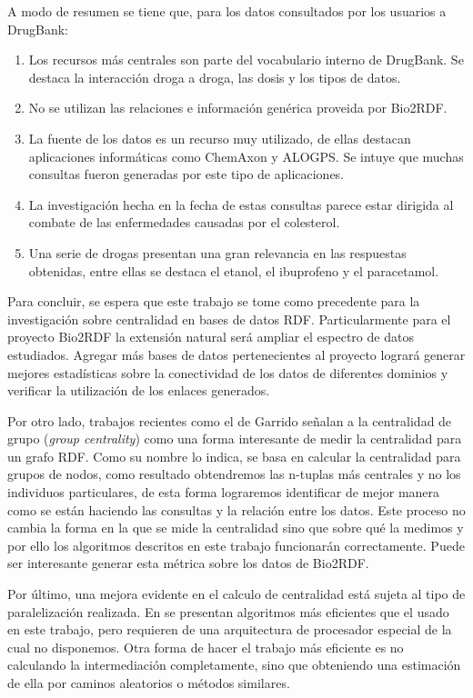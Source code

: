 A modo de resumen se tiene que, para los datos consultados por los usuarios a
DrugBank:
\begin{enumerate}
  \item
    Los recursos más centrales son parte del vocabulario interno de DrugBank.
    Se destaca la interacción droga a droga, las dosis y los tipos de datos.
  \item
    No se utilizan las relaciones e información genérica proveida por Bio2RDF.
  \item
    La fuente de los datos es un recurso muy utilizado, de ellas destacan
    aplicaciones informáticas como ChemAxon  y ALOGPS. Se intuye que muchas
    consultas fueron generadas por este tipo de aplicaciones.
  \item
    La investigación hecha en la fecha de estas consultas parece estar dirigida
    al combate de las enfermedades causadas por el colesterol.
  \item
    Una serie de drogas presentan una gran relevancia en las respuestas
    obtenidas, entre ellas se destaca el etanol, el ibuprofeno y el paracetamol.
\end{enumerate}

Para concluir, se espera que este trabajo se tome como precedente para la
investigación sobre centralidad en bases de datos RDF.
Particularmente para el proyecto Bio2RDF la extensión natural será ampliar el
espectro de datos estudiados. Agregar más bases de datos pertenecientes al
proyecto logrará generar mejores estadísticas sobre la conectividad de los datos
de diferentes dominios y verificar la utilización de los enlaces generados.

Por otro lado, trabajos recientes como el de Garrido 
\etal\cite{garrido2016group} señalan a la centralidad de grupo (\emph{group
centrality}) como una forma interesante de medir la centralidad para un grafo
RDF.
Como su nombre lo indica, se basa en calcular la centralidad para
grupos de nodos, como resultado obtendremos las n-tuplas más centrales y no los
individuos particulares, de esta forma lograremos identificar de mejor manera
como se están haciendo las consultas y la relación entre los datos.
Este proceso no cambia la forma en la que se mide la
centralidad sino que sobre qué la medimos y por ello los algoritmos descritos
en este trabajo funcionarán correctamente.
Puede ser interesante generar esta métrica sobre los datos de Bio2RDF.

Por último, una mejora evidente en el calculo de centralidad está sujeta al tipo
de paralelización realizada. En \cite{madduri2009faster} se presentan algoritmos
más eficientes que el usado en este trabajo, pero requieren de una arquitectura
de procesador especial de la cual no disponemos.
Otra forma de hacer el trabajo más eficiente es no calculando la intermediación
completamente, sino que obteniendo una estimación de ella por caminos
aleatorios o métodos similares.
